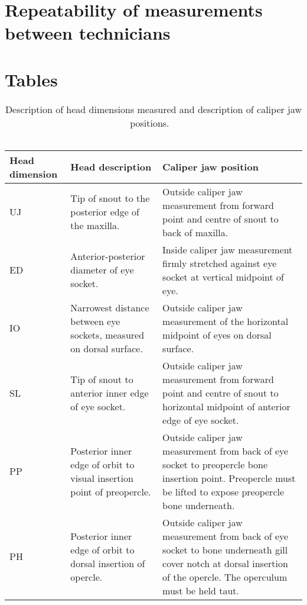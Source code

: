 \documentclass[12pt]{article}\usepackage[]{graphicx}\usepackage[]{color}
\begin{document}
\hypertarget{repeatability-of-measurements-between-technicians}{%
\section{Repeatability of measurements between technicians}\label{repeatability-of-measurements-between-technicians}}

\clearpage

\hypertarget{tables}{%
\section{Tables}\label{tables}}



\begin{table}[!h]

\caption{\label{tab:table1}Description of head dimensions measured and description of caliper jaw positions. ~\\
\hspace*{0.333em}\\}
\fontsize{10}{12}\selectfont
\begin{tabular}[t]{>{\raggedright\arraybackslash}p{1.9cm}>{\raggedright\arraybackslash}p{6.0cm}>{\raggedright\arraybackslash}p{7.5cm}}
\toprule
\textbf{Head dimension} & \textbf{Head description} & \textbf{Caliper jaw position}\\
\midrule
UJ & Tip of snout to the posterior edge of the maxilla. & Outside caliper jaw measurement from forward point and centre of snout to back of maxilla.\\
\midrule
ED & Anterior-posterior diameter of eye socket. & Inside caliper jaw measurement firmly stretched against eye socket at vertical midpoint of eye.\\
\midrule
IO & Narrowest distance between eye sockets, measured on dorsal surface. & Outside caliper jaw measurement of the horizontal midpoint of eyes on dorsal surface.\\
\midrule
SL & Tip of snout to anterior inner edge of eye socket. & Outside caliper jaw measurement from forward point and centre of snout to horizontal midpoint of anterior edge of eye socket.\\
\midrule
PP & Posterior inner edge of orbit to visual insertion point of preopercle. & Outside caliper jaw measurement from back of eye socket to preopercle bone insertion point. Preopercle must be lifted to expose preopercle bone underneath.\\
\midrule
\addlinespace
PH & Posterior inner edge of orbit to dorsal insertion of opercle. & Outside caliper jaw measurement from back of eye socket to bone underneath gill cover notch at dorsal insertion of the opercle.  The operculum must be held taut.\\
\bottomrule
\end{tabular}
\end{table}
~\\
\hspace*{0.333em}\\
\end{document}
